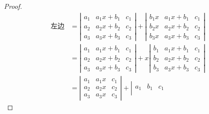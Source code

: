 \begin{frame}
\begin{proof}
$$
\begin{array}{rl}
  \mbox{左边} &= \left|
                \begin{array}{ccc}
                  a_1 & a_1x+b_1 & c_1\\
                  a_2 & a_2x+b_2 & c_2\\
                  a_3 & a_3x+b_3 & c_3        
                \end{array}
                                   \right| + \left|
                                   \begin{array}{ccc}
                                     b_1x & a_1x+b_1 & c_1\\
                                     b_2x & a_2x+b_2 & c_2\\
                                     b_3x & a_3x+b_3 & c_3        
                                   \end{array}
                                                       \right|\\[0.2in]
              &= \left|
                \begin{array}{ccc}
                  a_1 & a_1x+b_1 & c_1\\
                  a_2 & a_2x+b_2 & c_2\\
                  a_3 & a_3x+b_3 & c_3        
                \end{array}
                                   \right| + x\left|
                                   \begin{array}{ccc}
                                     b_1 & a_1x+b_1 & c_1\\
                                     b_2 & a_2x+b_2 & c_2\\
                                     b_3 & a_3x+b_3 & c_3        
                                   \end{array}
                                                      \right|\\[0.2in]
              &= \left|
                \begin{array}{ccc}
                  a_1 & a_1x & c_1\\
                  a_2 & a_2x & c_2\\
                  a_3 & a_3x & c_3        
                \end{array}
                               \right| + \left|
                               \begin{array}{ccc}
                                 a_1 & b_1 & c_1\\

\end{array}
\end{array}$$
\end{proof}
\end{frame}
